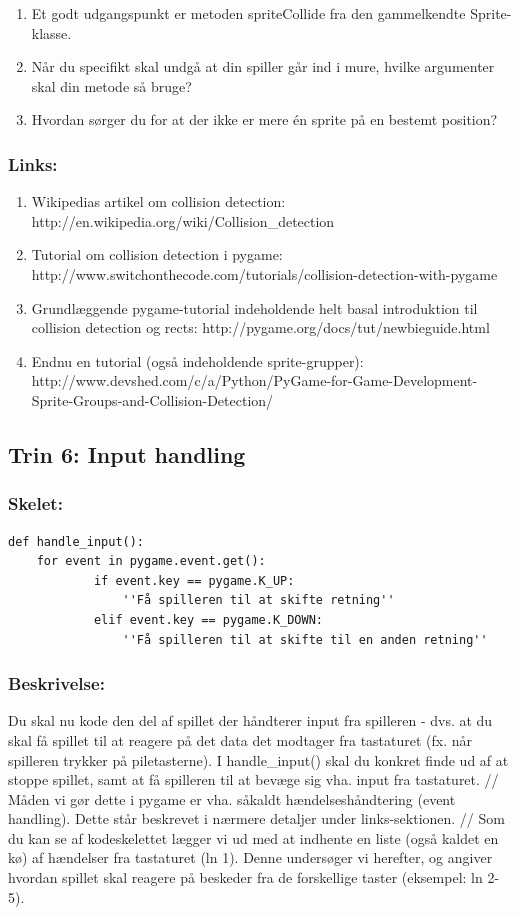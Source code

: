 \documentclass[10pt,a4paper,danish]{article}
\begin{document}
\begin{enumerate}
\item Et godt udgangspunkt er metoden spriteCollide fra den gammelkendte
Sprite-klasse. 
\item Når du specifikt skal undgå at din spiller går ind i mure, hvilke 
argumenter skal din metode så bruge?
\item Hvordan sørger du for at der ikke er mere én sprite på en bestemt
position?
\end{enumerate}

\subsubsection{Links:}
\begin{enumerate}
\item Wikipedias artikel om collision detection: http://en.wikipedia.org/wiki/Collision\_detection
\item Tutorial om collision detection i pygame: http://www.switchonthecode.com/tutorials/collision-detection-with-pygame
\item Grundlæggende pygame-tutorial indeholdende helt basal introduktion til collision detection
og rects: http://pygame.org/docs/tut/newbieguide.html
\item Endnu en tutorial (også indeholdende sprite-grupper): http://www.devshed.com/c/a/Python/PyGame-for-Game-Development-Sprite-Groups-and-Collision-Detection/
\end{enumerate}

\subsection{Trin 6: Input handling}
\subsubsection{Skelet:} 
\begin{verbatim}
def handle_input():
    for event in pygame.event.get():
            if event.key == pygame.K_UP:
                ''Få spilleren til at skifte retning''
            elif event.key == pygame.K_DOWN:
                ''Få spilleren til at skifte til en anden retning''
\end{verbatim}
\subsubsection{Beskrivelse:}
Du skal nu kode den del af spillet der håndterer input fra spilleren - 
dvs. at du skal få spillet til at reagere på det data det modtager fra
tastaturet (fx. når spilleren trykker på piletasterne). I handle\_input() 
skal du konkret finde ud af at stoppe spillet, samt at få spilleren til 
at bevæge sig vha. input fra tastaturet. 
//
Måden vi gør dette i pygame er vha. såkaldt hændelseshåndtering (event
handling). Dette står beskrevet i nærmere detaljer under links-sektionen. 
//
Som du kan se af kodeskelettet lægger vi ud med at indhente en liste 
(også kaldet en kø) af hændelser fra tastaturet (ln 1). Denne undersøger 
vi herefter, og angiver hvordan spillet skal reagere på beskeder fra de 
forskellige taster (eksempel: ln 2-5). 
\end{document}
